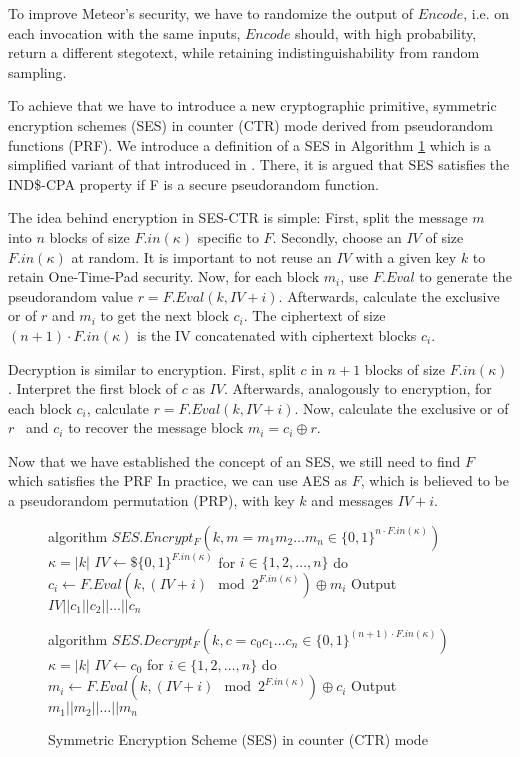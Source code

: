 To improve Meteor's security, we have to randomize the output of $Encode$, i.e. on each invocation with the same inputs, $Encode$ should, with high probability, return a different stegotext, while retaining indistinguishability from random sampling.

To achieve that we have to introduce a new cryptographic primitive, symmetric encryption schemes (SES) in counter (CTR) mode derived from pseudorandom functions (PRF).
We introduce a definition of a SES in Algorithm \ref{fig:ses} which is a simplified variant of that introduced in \cite{Berndt2017}.
There, it is argued that SES satisfies the IND\$-CPA property if F is a secure pseudorandom function.

The idea behind encryption in SES-CTR is simple:
First, split the message $m$ into $n$ blocks of size $F.in(\kappa)$ specific to $F$.
Secondly, choose an $IV$ of size $F.in(\kappa)$ at random.
It is important to not reuse an $IV$ with a given key $k$ to retain One-Time-Pad security.
Now, for each block $m_i$, use $F.Eval$ to generate the pseudorandom value $r = F.Eval(k, IV+i)$.
Afterwards, calculate the exclusive or of $r$ and $m_i$ to get the next block $c_i$.
The ciphertext of size $(n+1)\cdot F.in(\kappa)$ is the IV concatenated with ciphertext blocks $c_i$.

Decryption is similar to encryption.
First, split $c$ in $n+1$ blocks of size $F.in(\kappa)$.
Interpret the first block of $c$ as $IV$.
Afterwards, analogously to encryption, for each block $c_i$, calculate $r = F.Eval(k, IV+i)$.
Now, calculate the exclusive or of $r$~ and $c_i$ to recover the message block $m_i = c_i \oplus r$.

Now that we have established the concept of an SES, we still need to find $F$ which satisfies the PRF
In practice, we can use AES as $F$, which is believed to be a pseudorandom permutation (PRP), with key $k$ and messages $IV+i$.

\begin{figure}[htbp]%
	\centering%
	\begin{Pseudocode}[caption={Encryption}]%
algorithm $SES.Encrypt_F(k, m=m_1 m_2 \dots m_n \in \{0,1\}^{n\cdot F.in(\kappa)})$
	$\kappa = |k|$
	$IV \leftarrow\$ \{0,1\}^{F.in(\kappa)}$
	for $i \in \{ 1, 2, \dots, n \}$ do
		$c_i \leftarrow F.Eval(k, (IV+i) \mod 2^{F.in(\kappa)}) \oplus m_i$
	Output $IV||c_1||c_2||\dots||c_n$
	\end{Pseudocode}%
	\begin{Pseudocode}[caption={Decryption}]%
algorithm $SES.Decrypt_F(k, c=c_0 c_1 \dots c_n \in \{0,1\}^{(n+1)\cdot F.in(\kappa)})$
	$\kappa = |k|$
	$IV \leftarrow c_0$
	for $i \in \{ 1, 2, \dots, n \}$ do
		$m_i \leftarrow F.Eval(k, (IV+i) \mod 2^{F.in(\kappa)}) \oplus c_i$
	Output $m_1||m_2||\dots||m_n$
	\end{Pseudocode}%
	\caption{Symmetric Encryption Scheme (SES) in counter (CTR) mode}%
	\label{fig:ses}%
\end{figure}%


